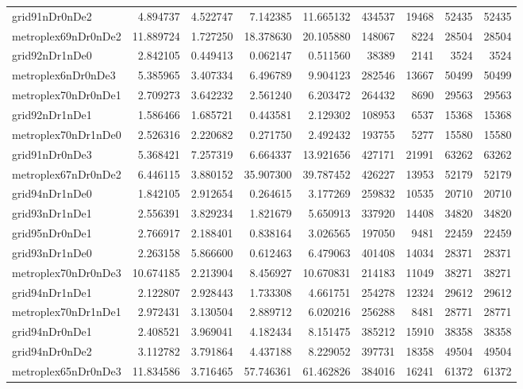 \begin{longtable}{|l|r|r|r|r|r|r|r|r|}
grid91nDr0nDe2 & 4.894737 & 4.522747 & 7.142385 & 11.665132 & 434537 & 19468 & 52435 & 52435 \\
metroplex69nDr0nDe2 & 11.889724 & 1.727250 & 18.378630 & 20.105880 & 148067 & 8224 & 28504 & 28504 \\
grid92nDr1nDe0 & 2.842105 & 0.449413 & 0.062147 & 0.511560 & 38389 & 2141 & 3524 & 3524 \\
metroplex6nDr0nDe3 & 5.385965 & 3.407334 & 6.496789 & 9.904123 & 282546 & 13667 & 50499 & 50499 \\
metroplex70nDr0nDe1 & 2.709273 & 3.642232 & 2.561240 & 6.203472 & 264432 & 8690 & 29563 & 29563 \\
grid92nDr1nDe1 & 1.586466 & 1.685721 & 0.443581 & 2.129302 & 108953 & 6537 & 15368 & 15368 \\
metroplex70nDr1nDe0 & 2.526316 & 2.220682 & 0.271750 & 2.492432 & 193755 & 5277 & 15580 & 15580 \\
grid91nDr0nDe3 & 5.368421 & 7.257319 & 6.664337 & 13.921656 & 427171 & 21991 & 63262 & 63262 \\
metroplex67nDr0nDe2 & 6.446115 & 3.880152 & 35.907300 & 39.787452 & 426227 & 13953 & 52179 & 52179 \\
grid94nDr1nDe0 & 1.842105 & 2.912654 & 0.264615 & 3.177269 & 259832 & 10535 & 20710 & 20710 \\
grid93nDr1nDe1 & 2.556391 & 3.829234 & 1.821679 & 5.650913 & 337920 & 14408 & 34820 & 34820 \\
grid95nDr0nDe1 & 2.766917 & 2.188401 & 0.838164 & 3.026565 & 197050 & 9481 & 22459 & 22459 \\
grid93nDr1nDe0 & 2.263158 & 5.866600 & 0.612463 & 6.479063 & 401408 & 14034 & 28371 & 28371 \\
metroplex70nDr0nDe3 & 10.674185 & 2.213904 & 8.456927 & 10.670831 & 214183 & 11049 & 38271 & 38271 \\
grid94nDr1nDe1 & 2.122807 & 2.928443 & 1.733308 & 4.661751 & 254278 & 12324 & 29612 & 29612 \\
metroplex70nDr1nDe1 & 2.972431 & 3.130504 & 2.889712 & 6.020216 & 256288 & 8481 & 28771 & 28771 \\
grid94nDr0nDe1 & 2.408521 & 3.969041 & 4.182434 & 8.151475 & 385212 & 15910 & 38358 & 38358 \\
grid94nDr0nDe2 & 3.112782 & 3.791864 & 4.437188 & 8.229052 & 397731 & 18358 & 49504 & 49504 \\
metroplex65nDr0nDe3 & 11.834586 & 3.716465 & 57.746361 & 61.462826 & 384016 & 16241 & 61372 & 61372 \\

\end{longtable}
